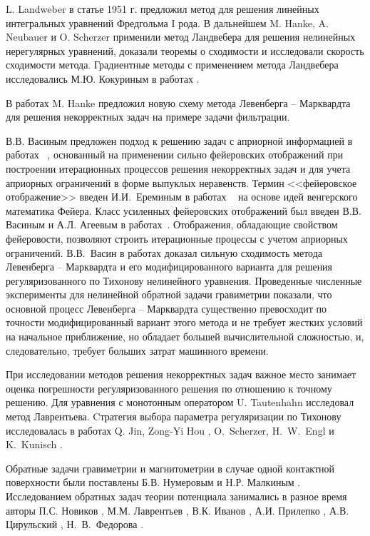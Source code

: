 {L. Landweber в статье \cite{Lan1951} 1951 г. предложил метод для решения линейных интегральных уравнений Фредгольма I рода. В дальнейшем M. Hanke, A. Neubauer и O. Scherzer \cite{HanNeuSch1995,Neu2000,NeuSch1995_2} применили метод Ландвебера для решения нелинейных нерегулярных уравнений, доказали теоремы о сходимости и исследовали скорость сходимости метода. Градиентные методы с применением метода Ландвебера исследовались М.Ю. Кокуриным в работах \cite{Kok2010_1,Kok2010_2}.

В работах \cite{Han1997,Han2010} M. Hanke предложил новую схему метода Левенберга -- Марквардта для решения некорректных задач на примере задачи фильтрации.

В.В. Васиным предложен подход к решению задач с априорной информацией в работах ~\cite{Vas1982, Vas1988,VasAge1993, VasEre2009}, основанный на применении сильно фейеровских отображений при построении итерационных процессов решения некорректных задач и для учета априорных ограничений в форме выпуклых неравенств. Термин <<фейеровское отображение>> введен И.И.~Ереминым в работах ~\cite{Ere1965, Ere1966, Ere1968} на основе идей венгерского математика Фейера. Класс усиленных фейеровских отображений был введен В.В. Васиным и А.Л. Агеевым в работах~\cite{VasAge1993,VasEre2009}. Отображения, обладающие свойством фейеровости, позволяют строить итерационные процессы с учетом априорных ограничений. В.В.~Васин в работах \cite{VasPer_2011,Vasin_2012} доказал сильную сходимость метода Левенберга -- Марквардта и его модифицированного варианта для решения регуляризованного по Тихонову нелинейного уравнения. Проведенные численные эксперименты для нелинейной обратной задачи гравиметрии показали, что основной процесс Левенберга -- Марквардта существенно превосходит по точности модифицированный вариант этого метода и не требует жестких условий на начальное приближение, но обладает большей вычислительной сложностью, и, следовательно, требует больших затрат машинного времени.

При исследовании методов решения некорректных задач важное место занимает оценка погрешности регуляризованного решения по отношению к точному решению. Для уравнения с монотонным оператором U. Tautenhahn \cite{Tau2002,Tau2004} исследовал метод Лаврентьева. Cтратегия выбора параметра регуляризации по Тихонову исследовалась в работах Q. Jin, Zong-Yi Hou \cite{JinZon1997,JinZon1999}, O.~Scherzer, H.~W.~Engl и K.~Kunisch \cite{SchEngKun1993}.

Обратные задачи гравиметрии и магнитометрии в случае одной контактной поверхности были поставлены Б.В. Нумеровым и Н.Р. Малкиным \cite{Num1930, Mal1931}. Исследованием обратных задач теории потенциала занимались в разное время авторы П.С. Новиков \cite{Nov1938}, М.М. Лаврентьев \cite{Lavr1956}, В.К. Иванов \cite{Iv1962_1}, А.И. Прилепко \cite{Pri1965}, А.В. Цирульский \cite{Tsi1990}, Н.~В.~Федорова \cite{FedTsi1976}.

}
